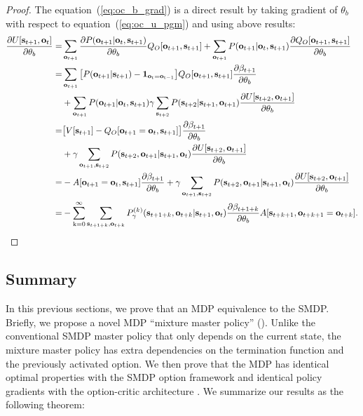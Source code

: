 \begin{proof}
  The equation~(\ref{eq:oc_b_grad}) is a direct result by taking
  gradient of $\theta_b$ with respect to
  equation~(\ref{eq:oc_u_pgm}) and using above results:
  \begin{align*}
    \frac{\partial U[ {\mathbf{s}}_{t+1},{\mathbf{o}}_t ]}{\partial \theta_b}=&\sum_{{\mathbf{o}}_{t+1}}\frac{\partial P({\mathbf{o}}_{t+1}|{\mathbf{o}}_t,{\mathbf{s}}_{t+1})}{\partial \theta_b}Q_O[{\mathbf{o}}_{t+1},{\mathbf{s}}_{t+1}] + \sum_{{\mathbf{o}}_{t+1}}P({\mathbf{o}}_{t+1}|{\mathbf{o}}_t,{\mathbf{s}}_{t+1})\frac{\partial Q_O[{\mathbf{o}}_{t+1},{\mathbf{s}}_{t+1}]}{\partial \theta_b}\\
    =&\sum_{{\mathbf{o}}_{t+1}} \big[P({\mathbf{o}}_{t+1}|{\mathbf{s}}_{t+1})-\bm{1}_\mathrm{{\mathbf{o}}_t={\mathbf{o}}_{t-1}}\big]Q_O[{\mathbf{o}}_{t+1},{\mathbf{s}}_{t+1}]\frac{\partial \beta_{t+1}}{\partial \theta_b}\\
    &+\sum_{{\mathbf{o}}_{t+1}}P({\mathbf{o}}_{t+1}|{\mathbf{o}}_t,{\mathbf{s}}_{t+1})\gamma\sum_{{\mathbf{s}}_{t+2}}P({\mathbf{s}}_{t+2}|{\mathbf{s}}_{t+1},{\mathbf{o}}_{t+1})\frac{\partial U[{\mathbf{s}}_{t+2},{\mathbf{o}}_{t+1}]}{\partial \theta_b}\\
    =& \big[V[ {\mathbf{s}}_{t+1} ]-Q_O[{\mathbf{o}}_{t+1}={\mathbf{o}}_t,{\mathbf{s}}_{t+1}]\big]\frac{\partial \beta_{t+1}}{\partial \theta_b}\\
    &+\gamma\sum_{{\mathbf{o}}_{t+1},{\mathbf{s}}_{t+2}}P({\mathbf{s}}_{t+2},{\mathbf{o}}_{t+1}|{\mathbf{s}}_{t+1},{\mathbf{o}}_{t})\frac{\partial U[{\mathbf{s}}_{t+2},{\mathbf{o}}_{t+1}]}{\partial \theta_b}\\
    =& -A[{\mathbf{o}}_{t+1}={\mathbf{o}}_t,{\mathbf{s}}_{t+1}]\frac{\partial \beta_{t+1}}{\partial \theta_b}+\gamma\sum_{{\mathbf{o}}_{t+1},{\mathbf{s}}_{t+2}}P({\mathbf{s}}_{t+2},{\mathbf{o}}_{t+1}|{\mathbf{s}}_{t+1},{\mathbf{o}}_{t})\frac{\partial U[{\mathbf{s}}_{t+2},{\mathbf{o}}_{t+1}]}{\partial \theta_b}\\
    =&-\sum_{{\textnormal{k}}=0}^\infty\sum_{{\mathbf{s}}_{t+1+k},{\mathbf{o}}_{t+k}}P_\gamma^{(k)}({\mathbf{s}}_{t+1+k},{\mathbf{o}}_{t+k}|{\mathbf{s}}_{t+1},{\mathbf{o}}_t)
                         \frac{\partial \beta_{t+1+k}}{\partial \theta_b}A[ {\mathbf{s}}_{t+k+1},{\mathbf{o}}_{t+k+1}={\mathbf{o}}_{t+k}].
  \end{align*}
  
\end{proof}

\subsection{Summary}
\label{sec:equiva_conc}
In this previous sections, we prove that an MDP equivalence to
the SMDP. Briefly, we propose a novel MDP ``mixture master
policy'' (). Unlike the conventional SMDP
master policy that only depends on the current state, the mixture
master policy has extra dependencies on the termination function
and the previously activated option. We then prove that the MDP
has identical optimal properties with the SMDP option framework
\cite{sutton1999between} and identical policy gradients with the
option-critic architecture \cite{bacon2017option}. We summarize
our results as the following theorem:

